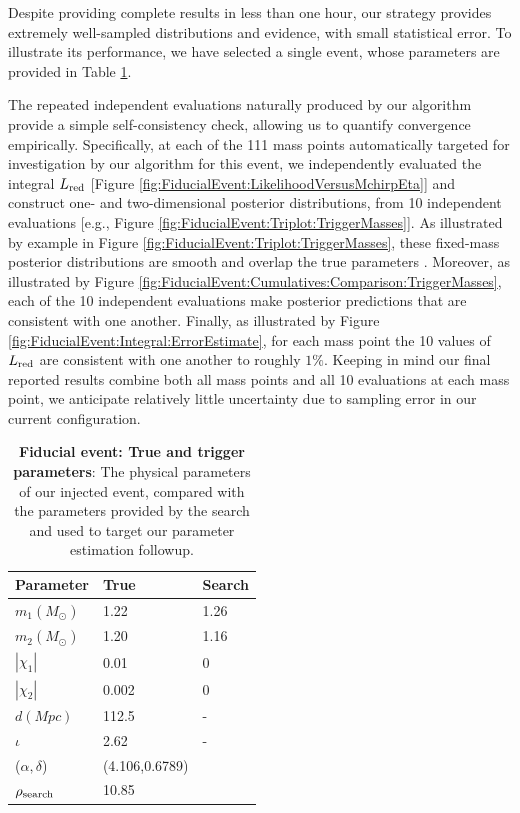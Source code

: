 Despite providing complete results in less than one hour, our strategy provides extremely well-sampled distributions and
evidence, with small statistical error.   To illustrate its performance, we have selected a single event, whose
parameters are provided in Table \ref{tab:FiducialEvent:Parameters}.   
%



The repeated independent evaluations naturally produced by our algorithm provide a simple self-consistency check,
allowing us to quantify convergence empirically.  
Specifically, at each of the 111 mass points automatically targeted for investigation by our algorithm for this event, we
independently evaluated the integral $L_{\rm red}$ [Figure \ref{fig:FiducialEvent:LikelihoodVersusMchirpEta}] and construct one- and two-dimensional posterior distributions, from
10 independent evaluations [e.g., Figure \ref{fig:FiducialEvent:Triplot:TriggerMasses}].    
%
As illustrated by example in Figure \ref{fig:FiducialEvent:Triplot:TriggerMasses}, these fixed-mass posterior
distributions are smooth and overlap the true parameters .  
%
Moreover, as illustrated by Figure \ref{fig:FiducialEvent:Cumulatives:Comparison:TriggerMasses}, each of the 10
independent evaluations make posterior predictions that are consistent with one another.   
%
Finally, as illustrated by Figure \ref{fig:FiducialEvent:Integral:ErrorEstimate}, for each mass point the 10 values of $L_{\rm red}$
are consistent with one another to roughly $1\%$.  
%
Keeping in mind our final reported results combine both all mass points and all 10 evaluations at each mass point, we
anticipate relatively little uncertainty due to sampling error in our current configuration.  


\begin{table}
\begin{tabular}{l|ll}
Parameter & True & Search \\ \hline
$m_1 (M_\odot)$ &  1.22 & 1.26 \\
$m_2 (M_\odot)$ &  1.20 & 1.16 \\
$|\chi_1| $ & 0.01  & 0 \\
$|\chi_2| $ & 0.002 & 0 \\
$d (\unit{Mpc}) $ & 112.5 & - \\
$\iota $ & 2.62 & - \\
($\alpha,\delta$) & (4.106,0.6789) &\\ 
$\rho_{\rm search}$ & 10.85 \\
\end{tabular}
\caption{\label{tab:FiducialEvent:Parameters}\textbf{Fiducial event: True and trigger parameters}: The physical parameters of our injected event, compared
  with the parameters provided by the search and used to target our parameter estimation followup.
}
\end{table}

